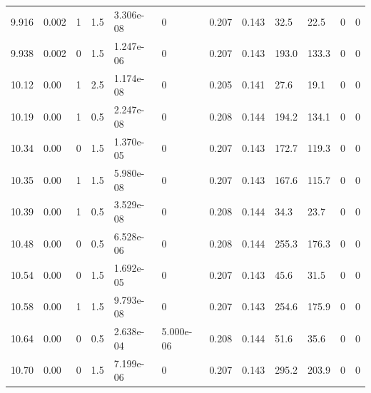 \documentclass[preview]{standalone}
\begin{document}
{{{\begin{tabular}{L{1.2cm}C{1.2cm} C{0.3cm}C{0.5cm} C{1.4cm}C{1.4cm} C{1.4cm}C{1.4cm} C{1.6cm}C{1.6cm} C{1.6cm}C{1.6cm}}
  9.916  &  0.002  & 1     & 1.5 &  3.306e-08  & 0  &  0.207&   0.143& 32.5 & 22.5   &  0 & 0  \\ 
  9.938  &  0.002  & 0     & 1.5 &  1.247e-06  & 0  &  0.207&   0.143& 193.0 & 133.3   &  0 & 0  \\ 
  10.12  &  0.00  & 1     & 2.5 &  1.174e-08  & 0  &  0.205&   0.141& 27.6 & 19.1   &  0 & 0  \\ 
  10.19  &  0.00  & 1     & 0.5 &  2.247e-08  & 0  &  0.208&   0.144& 194.2 & 134.1   &  0 & 0  \\ 
  10.34  &  0.00  & 0     & 1.5 &  1.370e-05  & 0  &  0.207&   0.143& 172.7 & 119.3   &  0 & 0  \\ 
  10.35  &  0.00  & 1     & 1.5 &  5.980e-08  & 0  &  0.207&   0.143& 167.6 & 115.7   &  0 & 0  \\ 
  10.39  &  0.00  & 1     & 0.5 &  3.529e-08  & 0  &  0.208&   0.144& 34.3 & 23.7   &  0 & 0  \\ 
  10.48  &  0.00  & 0     & 0.5 &  6.528e-06  & 0  &  0.208&   0.144& 255.3 & 176.3   &  0 & 0  \\ 
  10.54  &  0.00  & 0     & 1.5 &  1.692e-05  & 0  &  0.207&   0.143& 45.6 & 31.5   &  0 & 0  \\ 
  10.58  &  0.00  & 1     & 1.5 &  9.793e-08  & 0  &  0.207&   0.143& 254.6 & 175.9   &  0 & 0  \\ 
  10.64  &  0.00  & 0     & 0.5 &  2.638e-04  & 5.000e-06  &  0.208&   0.144& 51.6 & 35.6   &  0 & 0  \\ 
  10.70  &  0.00  & 0     & 1.5 &  7.199e-06  & 0  &  0.207&   0.143& 295.2 & 203.9   &  0 & 0  \\ 
\hline 
\end{tabular} 

}}}
\end{document}
